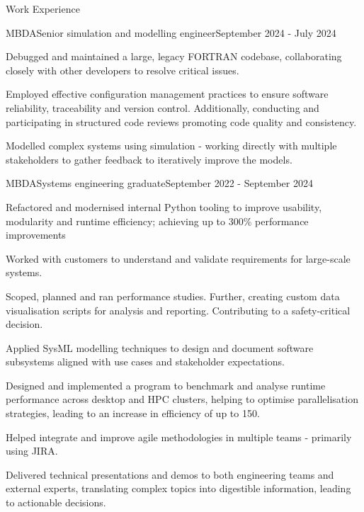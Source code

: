 \documentclass[a4paper]{article}
\newlength{\tabin}
\newlength{\secsep}
\newcommand{\lineunder}{\vspace*{-8pt} \\ \hspace*{-6pt} \hrulefill \\ \vspace*{-15pt}}
\newenvironment{tabbedsection}[1]{
  \begin{list}{}{
      \setlength{\itemsep}{0pt}
      \setlength{\labelsep}{0pt}
      \setlength{\labelwidth}{0pt}
      \setlength{\leftmargin}{\tabin}
      \setlength{\rightmargin}{\tabin}
      \setlength{\listparindent}{0pt}
      \setlength{\parsep}{0pt}
      \setlength{\parskip}{0pt}
      \setlength{\partopsep}{0pt}
      \setlength{\topsep}{#1}
    }
  \item[]
}{\end{list}}
\newenvironment{resume_section}[1]{
  \filbreak
  \vspace{2\secsep}
  \textsc{\large#1}
  \lineunder
  \begin{tabbedsection}{\secsep}
}{\end{tabbedsection}}
\newenvironment{resume_employer}[4]{
  \vspace{\secsep}
  \textbf{#1} \\ 
  \indent {\small #2} \hfill {\footnotesize#3 (#4)}
  \begin{tabbedsection}{0pt}
  \begin{subitems}
}{\end{subitems}\end{tabbedsection}}
\newenvironment{subitems}{
  \renewcommand{\labelitemi}{-}
  \begin{itemize}
      \setlength{\labelsep}{1em}
}{\end{itemize}}
\begin{document}
\begin{resume_section}{Work Experience}
  \begin{resume_employer}{MBDA}{Senior simulation and modelling engineer}{}{September 2024 - July 2024}
    \item Debugged and maintained a large, legacy FORTRAN codebase, collaborating closely with other developers to resolve critical issues.
    \item Employed effective configuration management practices to ensure software reliability, traceability and version control. Additionally, conducting and participating in structured code reviews promoting code quality and consistency.
    \item Modelled complex systems using simulation - working directly with multiple stakeholders to gather feedback to iteratively improve the models.
  \end{resume_employer}

  \begin{resume_employer}{MBDA}{Systems engineering graduate}{}{September 2022 - September 2024}
    \item Refactored and modernised internal Python tooling to improve usability, modularity and runtime efficiency; achieving up to 300\% performance improvements
    \item Worked with customers to understand and validate requirements for large-scale systems.
    \item Scoped, planned and ran performance studies. Further, creating custom data visualisation scripts for analysis and reporting. Contributing to a safety-critical decision.
    \item Applied SysML modelling techniques to design and document software subsystems aligned with use cases and stakeholder expectations.
    \item Designed and implemented a program to benchmark and analyse runtime performance across desktop and HPC clusters, helping to optimise parallelisation strategies, leading to an increase in efficiency of up to 150\4. 
    \item Helped integrate and improve agile methodologies in multiple teams - primarily using JIRA.
    \item Delivered technical presentations and demos to both engineering teams and external experts, translating complex topics into digestible information, leading to actionable decisions.
  \end{resume_employer}


\end{resume_section}
\end{document}

